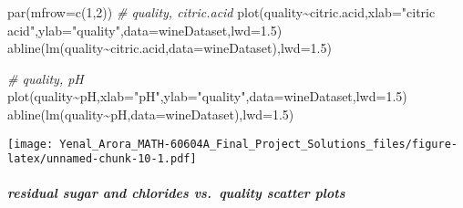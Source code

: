 \documentclass[
]{article}
\newenvironment{Shaded}{\begin{snugshade}}{\end{snugshade}}
\newcommand{\AttributeTok}[1]{\textcolor[rgb]{0.77,0.63,0.00}{#1}}
\newcommand{\CommentTok}[1]{\textcolor[rgb]{0.56,0.35,0.01}{\textit{#1}}}
\newcommand{\DecValTok}[1]{\textcolor[rgb]{0.00,0.00,0.81}{#1}}
\newcommand{\FloatTok}[1]{\textcolor[rgb]{0.00,0.00,0.81}{#1}}
\newcommand{\FunctionTok}[1]{\textcolor[rgb]{0.00,0.00,0.00}{#1}}
\newcommand{\NormalTok}[1]{#1}
\newcommand{\SpecialCharTok}[1]{\textcolor[rgb]{0.00,0.00,0.00}{#1}}
\newcommand{\StringTok}[1]{\textcolor[rgb]{0.31,0.60,0.02}{#1}}
\begin{document}
\begin{Shaded}
\begin{Highlighting}[]
\FunctionTok{par}\NormalTok{(}\AttributeTok{mfrow=}\FunctionTok{c}\NormalTok{(}\DecValTok{1}\NormalTok{,}\DecValTok{2}\NormalTok{))}
\CommentTok{\# quality, citric.acid}
\FunctionTok{plot}\NormalTok{(quality}\SpecialCharTok{\textasciitilde{}}\NormalTok{citric.acid,}\AttributeTok{xlab=}\StringTok{"citric acid"}\NormalTok{,}\AttributeTok{ylab=}\StringTok{"quality"}\NormalTok{,}\AttributeTok{data=}\NormalTok{wineDataset,}\AttributeTok{lwd=}\FloatTok{1.5}\NormalTok{)}
\FunctionTok{abline}\NormalTok{(}\FunctionTok{lm}\NormalTok{(quality}\SpecialCharTok{\textasciitilde{}}\NormalTok{citric.acid,}\AttributeTok{data=}\NormalTok{wineDataset),}\AttributeTok{lwd=}\FloatTok{1.5}\NormalTok{)}

\CommentTok{\# quality, pH}
\FunctionTok{plot}\NormalTok{(quality}\SpecialCharTok{\textasciitilde{}}\NormalTok{pH,}\AttributeTok{xlab=}\StringTok{"pH"}\NormalTok{,}\AttributeTok{ylab=}\StringTok{"quality"}\NormalTok{,}\AttributeTok{data=}\NormalTok{wineDataset,}\AttributeTok{lwd=}\FloatTok{1.5}\NormalTok{)}
\FunctionTok{abline}\NormalTok{(}\FunctionTok{lm}\NormalTok{(quality}\SpecialCharTok{\textasciitilde{}}\NormalTok{pH,}\AttributeTok{data=}\NormalTok{wineDataset),}\AttributeTok{lwd=}\FloatTok{1.5}\NormalTok{)}
\end{Highlighting}
\end{Shaded}

\texttt{[image: Yenal\_Arora\_MATH-60604A\_Final\_Project\_Solutions\_files/figure-latex/unnamed-chunk-10-1.pdf]}

\hypertarget{residual-sugar-and-chlorides-vs.-quality-scatter-plots}{%
\subparagraph{residual sugar and chlorides vs.~quality scatter
plots}\label{residual-sugar-and-chlorides-vs.-quality-scatter-plots}}
\end{document}
